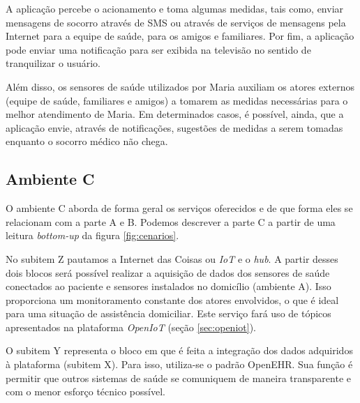 A aplicação percebe o acionamento e toma algumas medidas, tais como, enviar
mensagens de socorro através de SMS ou através de serviços de mensagens pela
Internet para a equipe de saúde, para os amigos e familiares.  Por fim, a
aplicação pode enviar uma notificação para ser exibida na televisão no sentido
de tranquilizar o usuário.

Além disso, os sensores de saúde utilizados por Maria auxiliam os atores
externos (equipe de saúde, familiares e amigos) a tomarem as medidas
necessárias para o melhor atendimento de Maria.  Em determinados casos, é
possível, ainda, que a aplicação envie, através de notificações, sugestões de
medidas a serem tomadas enquanto o socorro médico não chega.

\subsection{Ambiente C} \label{subsec:ambiente-c}

O ambiente C aborda de forma geral os serviços oferecidos e de que forma eles se
relacionam com a parte A e B. Podemos descrever a parte C a partir de uma leitura 
\textit{bottom-up} da figura \ref{fig:cenarios}. 

No subitem Z pautamos a Internet das Coisas ou \textit{IoT} e o \textit{hub}. A
partir desses dois blocos será possível realizar a aquisição de dados dos sensores
de saúde conectados ao paciente e sensores instalados no domicílio (ambiente A).
Isso proporciona um monitoramento constante dos atores envolvidos, o que é ideal
para uma situação de assistência domiciliar. Este serviço fará uso de tópicos
apresentados na plataforma \textit{OpenIoT} (seção \vref{sec:openiot}).

O subitem Y representa o bloco em que é feita a integração dos dados adquiridos
à plataforma \nextsaude[] (subitem X). Para isso, utiliza-se o padrão OpenEHR. Sua 
função é permitir que outros sistemas de saúde se comuniquem de maneira transparente 
e com o menor esforço técnico possível.


